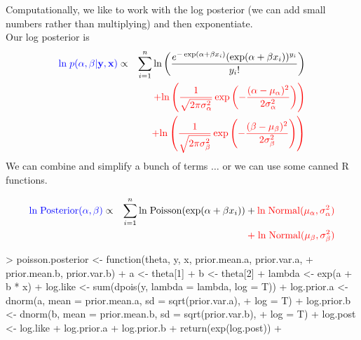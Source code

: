 \documentclass[handout]{beamer}
\begin{document}
\begin{frame}[fragile]
Computationally, we like to work with the log posterior (we can add
small numbers rather than multiplying) and then exponentiate.\\
\bigskip
\pause 
Our log posterior is
\footnotesize
\begin{eqnarray*}
\textcolor{blue}{\mathrm{ln} \; p(\alpha, \beta | \mathbf{y}, \mathbf{x})} &\propto&
\sum_{i=1}^n \mathrm{ln} \left( \frac{e^{-\exp (\alpha + \beta x_i)}
(\exp (\alpha + \beta x_i))^{y_i}}{y_i !} \right) \\
&\phantom{\propto}& \textcolor{red}{ + \mathrm{ln}
\left( \frac{1}{\sqrt{2\pi \sigma^2_{\alpha}}} \exp  \left(-\frac{(\alpha -
\mu_{\alpha})^2}{2 \sigma_{\alpha}^2}\right) \right) }\\ 
&\phantom{\propto}&  \textcolor{red}{+ \mathrm{ln} \left( \frac{1}{\sqrt{2\pi
\sigma^2_{\beta}}} \exp \left(-\frac{(\beta - \mu_{\beta})^2}{2
\sigma_{\beta}^2}\right) \right)} 
\end{eqnarray*}
\normalsize
\pause
We can combine and simplify a bunch of terms $\dots$ \pause or we can
use some canned R functions.
\end{frame}

\begin{frame}[fragile]
\footnotesize
\begin{eqnarray*}
\textcolor{blue}{\mathrm{ln \; Posterior}(\alpha, \beta)} &\propto& \sum_{i=1}^n
\mathrm{ln \; Poisson}(\exp (\alpha + \beta x_i)) + \textcolor{red}{\mathrm{ln \;
Normal}(\mu_{\alpha}, \sigma^2_{\alpha}) } \\
&\phantom{\propto}& \textcolor{red}{+ \; \mathrm{ln \; Normal}(\mu_{\beta}, \sigma^2_{\beta})} \\
\end{eqnarray*}
\pause
\tiny
\begin{Schunk}
\begin{Sinput}
> poisson.posterior <- function(theta, y, x, prior.mean.a, prior.var.a, 
+     prior.mean.b, prior.var.b) {
+     a <- theta[1]
+     b <- theta[2]
+     lambda <- exp(a + b * x)
+     log.like <- sum(dpois(y, lambda = lambda, log = T))
+     log.prior.a <- dnorm(a, mean = prior.mean.a, sd = sqrt(prior.var.a), 
+         log = T)
+     log.prior.b <- dnorm(b, mean = prior.mean.b, sd = sqrt(prior.var.b), 
+         log = T)
+     log.post <- log.like + log.prior.a + log.prior.b
+     return(exp(log.post))
+ }
\end{Sinput}
\end{Schunk}
\normalsize 
\end{frame}
\end{document}
